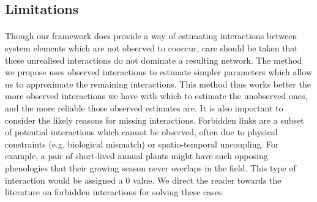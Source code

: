 \documentclass[a4,12pt]{article}
\begin{document}

   \subsection{Limitations}
        
        \paragraph{}
        Though our framework does provide a way of estimating interactions between system elements which are not observed to cooccur, care should be taken that these unrealised interactions do not dominate a resulting network. The method we propose uses observed interactions to estimate simpler parameters which allow us to approximate the remaining interactions. This method thus works better the more observed interactions we have with which to estimate the unobserved ones, and the more reliable those observed estimates are. It is also important to consider the likely reasons for missing interactions. Forbidden links are a subset of potential interactions which cannot be observed, often due to physical constraints (e.g. biological mismatch) or spatio-temporal uncoupling. For example, a pair of short-lived annual plants might have such opposing phenologies that their growing season never overlaps in the field. This type of interaction would be assigned a 0 value. We direct the reader towards the literature on forbidden interactions \parencite{Olesen2011, Jordano2016} for solving these cases. 
\end{document}
